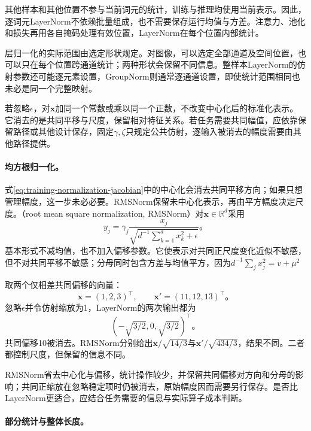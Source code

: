 其他样本和其他位置不参与当前词元的统计，训练与推理均使用当前表示。因此，逐词元LayerNorm不依赖批量组成，也不需要保存运行均值与方差。注意力、池化和损失再用各自掩码处理有效位置，LayerNorm在每个位置内部统计。

层归一化的实际范围由选定形状规定。对图像，可以选定全部通道及空间位置，也可以只在每个位置跨通道统计；两种形状会保留不同信息。整样本LayerNorm的仿射参数还可能逐元素设置，GroupNorm则通常逐通道设置，即使统计范围相同也未必是同一个完整映射。

若忽略$\epsilon$，对$\bm x$加同一个常数或乘以同一个正数，不改变中心化后的标准化表示。它消去的是共同平移与尺度，保留相对特征关系。若任务需要共同幅值，应依靠保留路径或其他设计保存，固定$\gamma,\zeta$只规定公共仿射，逐输入被消去的幅度需要由其他路径提供。

\paragraph{均方根归一化。}

式\eqref{eq:training-normalization-jacobian}中的中心化会消去共同平移方向；如果只想管理幅度，这一步未必必要。RMSNorm保留未中心化表示，再由平方幅度决定尺度。（root mean square normalization, RMSNorm）对$\bm x\in\mathbb R^d$采用
\begin{equation}
  y_j=\gamma_j\frac{x_j}{\sqrt{d^{-1}\sum_{k=1}^d x_k^2+\epsilon}}\text{。}
  \label{eq:training-rmsnorm}
\end{equation}
基本形式不减均值，也不加入偏移参数。它使表示对共同正尺度变化近似不敏感，但不对共同平移不敏感；分母同时包含方差与均值平方，因为$d^{-1}\sum_jx_j^2=v+\mu^2$

\begin{example}[减去均值改变了哪些信息]
  \label{ex:training-layer-rms}
  取两个仅相差共同偏移的向量：
  \[
    \bm x=(1,2,3)^{\top},\qquad \bm x'=(11,12,13)^{\top}\text{。}
  \]
  忽略$\epsilon$并令仿射缩放为1，LayerNorm的两次输出都为
  \[
    (-\sqrt{3/2},0,\sqrt{3/2})^{\top}\text{。}
  \]
  共同偏移10被消去。RMSNorm分别给出$\bm x/\sqrt{14/3}$与$\bm x'/\sqrt{434/3}$，结果不同。二者都控制尺度，但保留的信息不同。
\end{example}

RMSNorm省去中心化与偏移，统计操作较少，并保留共同偏移对方向和分母的影响；共同正缩放在忽略稳定项时仍被消去，原始幅度因而需要另行保存。是否比LayerNorm更适合，应结合任务需要的信息与实际算子成本判断。

\paragraph{部分统计与整体长度。}

